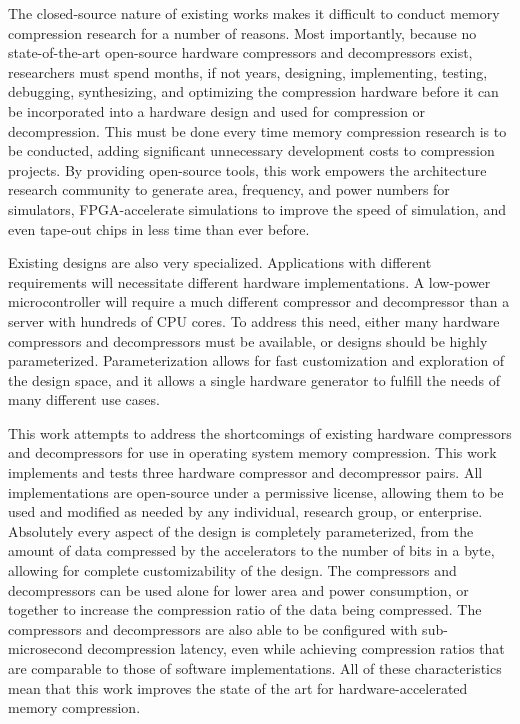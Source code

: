 \documentclass[doublespace,nopageskip]{VTthesis}
\begin{document}
The closed-source nature of existing works makes it difficult to conduct memory compression research for a number of reasons. Most importantly, because no state-of-the-art open-source hardware compressors and decompressors exist, researchers must spend months, if not years, designing, implementing, testing, debugging, synthesizing, and optimizing the compression hardware before it can be incorporated into a hardware design and used for compression or decompression. This must be done every time memory compression research is to be conducted, adding significant unnecessary development costs to compression projects. By providing open-source tools, this work empowers the architecture research community to generate area, frequency, and power numbers for simulators, FPGA-accelerate simulations to improve the speed of simulation, and even tape-out chips in less time than ever before.

Existing designs are also very specialized. Applications with different requirements will necessitate different hardware implementations. A low-power microcontroller will require a much different compressor and decompressor than a server with hundreds of CPU cores. To address this need, either many hardware compressors and decompressors must be available, or designs should be highly parameterized. Parameterization allows for fast customization and exploration of the design space, and it allows a single hardware generator to fulfill the needs of many different use cases.

This work attempts to address the shortcomings of existing hardware compressors and decompressors for use in operating system memory compression. This work implements and tests three hardware compressor and decompressor pairs. All implementations are open-source under a permissive license, allowing them to be used and modified as needed by any individual, research group, or enterprise. Absolutely every aspect of the design is completely parameterized, from the amount of data compressed by the accelerators to the number of bits in a byte, allowing for complete customizability of the design. The compressors and decompressors can be used alone for lower area and power consumption, or together to increase the compression ratio of the data being compressed. The compressors and decompressors are also able to be configured with sub-microsecond decompression latency, even while achieving compression ratios that are comparable to those of software implementations. All of these characteristics mean that this work improves the state of the art for hardware-accelerated memory compression.
\end{document}

